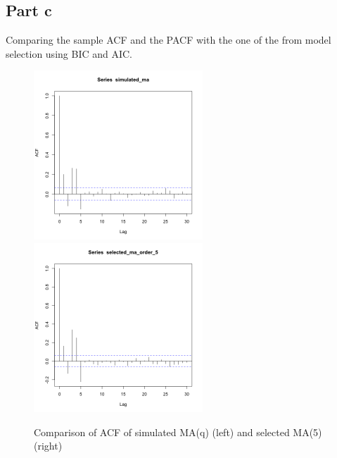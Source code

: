 \documentclass[11pt, oneside]{article}   	%
\begin{document}
\subsection{Part c}
Comparing the sample ACF and the PACF with the one of the from model selection using BIC and AIC.
\begin{figure}[H] %
   \centering
   \includegraphics[width=2.5in]{acf-simulated-ma} 
   \includegraphics[width=2.5in]{acf-selected-ma} 
   \caption{Comparison of ACF of simulated MA(q) (left) and selected MA(5) (right)}
   \label{fig:acf}
\end{figure}
\end{document}
